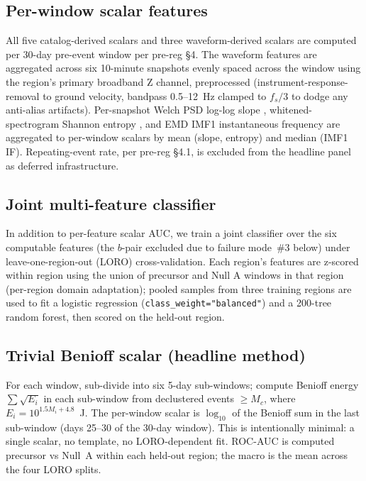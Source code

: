 \documentclass[11pt]{article}
\begin{document}
\subsection{Per-window scalar features}
\label{sec:methods-features}

All five catalog-derived scalars and three waveform-derived scalars are
computed per 30-day pre-event window per pre-reg \S 4. The waveform
features are aggregated across six 10-minute snapshots evenly spaced
across the window using the region's primary broadband Z channel,
preprocessed (instrument-response-removal to ground velocity, bandpass
0.5--12~Hz clamped to $f_s/3$ to dodge any anti-alias artifacts).
Per-snapshot Welch PSD log-log slope \citep{brune1970}, whitened-
spectrogram Shannon entropy \citep{bensen2007}, and EMD IMF1
instantaneous frequency \citep{huang1998} are aggregated to per-window
scalars by mean (slope, entropy) and median (IMF1 IF). Repeating-event
rate, per pre-reg \S 4.1, is excluded from the headline panel as
deferred infrastructure.

\subsection{Joint multi-feature classifier}
\label{sec:methods-clf}

In addition to per-feature scalar AUC, we train a joint classifier over
the six computable features (the $b$-pair excluded due to failure
mode~\#3 below) under leave-one-region-out (LORO) cross-validation.
Each region's features are z-scored within region using the union of
precursor and Null A windows in that region (per-region domain
adaptation); pooled samples from three training regions are used to
fit a logistic regression (\texttt{class\_weight="balanced"}) and a
200-tree random forest, then scored on the held-out region.

\subsection{Trivial Benioff scalar (headline method)}
\label{sec:methods-scalar}

For each window, sub-divide into six 5-day sub-windows; compute Benioff
energy $\sum \sqrt{E_i}$ in each sub-window from declustered events
$\ge M_c$, where $E_i = 10^{1.5 M_i + 4.8}$~J. The per-window scalar
is $\log_{10}$ of the Benioff sum in the last sub-window (days 25--30
of the 30-day window). This is intentionally minimal: a single scalar,
no template, no LORO-dependent fit. ROC-AUC is computed precursor vs
Null~A within each held-out region; the macro is the mean across the
four LORO splits.
\end{document}
